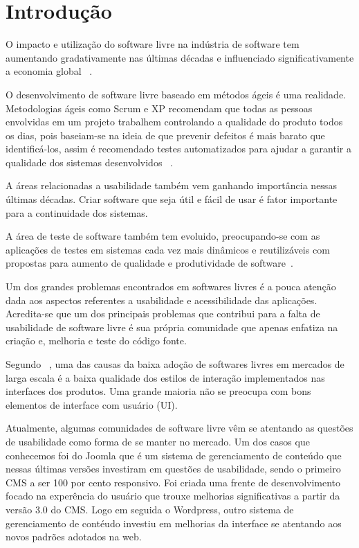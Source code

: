 \chapter{Introdução}

O impacto e utilização do software livre na indústria de software tem aumentando gradativamente nas últimas décadas e influenciado significativamente a economia global ~\cite{benkler2006}. 

O desenvolvimento de software livre baseado em métodos ágeis é uma realidade. Metodologias ágeis como Scrum e XP recomendam que todas as pessoas envolvidas em um projeto trabalhem controlando a qualidade do produto todos os dias, pois baseiam-se na ideia de que prevenir defeitos é mais barato que identificá-los, assim é recomendado testes automatizados para ajudar a garantir a qualidade dos sistemas desenvolvidos ~\cite{bernardo2011}.

A áreas relacionadas a usabilidade também vem ganhando importância nessas últimas décadas. Criar software que seja útil e fácil de usar é fator importante para a continuidade dos sistemas.

A área de teste de software também tem evoluido, preocupando-se com as aplicações de testes	em sistemas cada vez mais dinâmicos e reutilizáveis com propostas para aumento de qualidade e produtividade de software~\cite{vicente2010}.

Um dos grandes problemas encontrados em softwares livres é a pouca atenção dada aos aspectos referentes a usabilidade e acessibilidade das aplicações. Acredita-se que um dos principais problemas que contribui para a falta de usabilidade de software livre é sua própria comunidade que apenas enfatiza na criação e, melhoria e teste do código fonte.  

Segundo ~, uma das causas da baixa adoção de softwares livres em mercados de larga escala é a baixa qualidade dos estilos de interação implementados nas interfaces dos produtos. Uma grande maioria não se preocupa com bons elementos de interface com usuário (UI). 

Atualmente, algumas comunidades de software livre vêm se atentando as questões de usabilidade como forma de se manter no mercado. Um dos casos que conhecemos foi do Joomla que é um sistema de gerenciamento de conteúdo  que nessas últimas versões investiram em questões de usabilidade, sendo o primeiro CMS a ser 100 por cento responsivo. Foi criada uma frente de desenvolvimento focado na experência do usuário que trouxe melhorias significativas a partir da versão 3.0 do CMS. Logo em seguida o Wordpress, outro sistema de gerenciamento de contéudo investiu em melhorias da interface se atentando aos novos padrões adotados na web.

